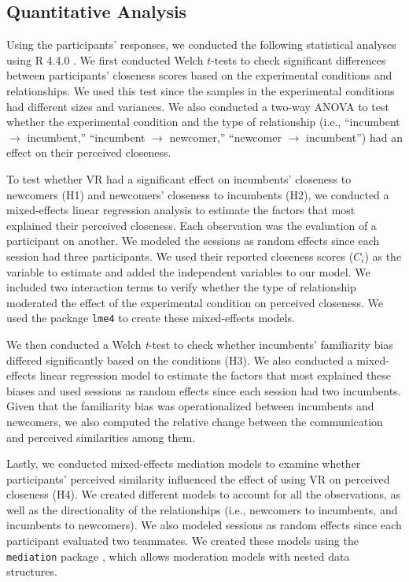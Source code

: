 \subsection{Quantitative Analysis}
Using the participants' responses, we conducted the following statistical analyses using R 4.4.0 \cite{R2024}.  We first conducted Welch $t$-tests to check significant differences between participants' closeness scores based on the experimental conditions and relationships. We used this test since the samples in the experimental conditions had different sizes and variances. We also conducted a two-way ANOVA to test whether the experimental condition and the type of relationship (i.e., ``incumbent $\rightarrow$ incumbent,'' ``incumbent $\rightarrow$ newcomer,'' ``newcomer $\rightarrow$ incumbent'') had an effect on their perceived closeness. 

To test whether VR had a significant effect on incumbents' closeness to newcomers (H1) and newcomers' closeness to incumbents (H2), we conducted a mixed-effects linear regression analysis to estimate the factors that most explained their perceived closeness. Each observation was the evaluation of a participant on another. We modeled the sessions as random effects since each session had three participants. We used their reported closeness scores ($C_{i}$) as the variable to estimate and added the independent variables to our model. We included two interaction terms to verify whether the type of relationship moderated the effect of the experimental condition on perceived closeness. We used the package \texttt{lme4} \cite{Bates2015} to create these mixed-effects models.

We then conducted a Welch \textit{t}-test to check whether incumbents' familiarity bias differed significantly based on the conditions (H3). We also conducted a mixed-effects linear regression model to estimate the factors that most explained these biases and used sessions as random effects since each session had two incumbents. Given that the familiarity bias was operationalized between incumbents and newcomers, we also computed the relative change between the communication and perceived similarities among them.

Lastly, we conducted mixed-effects mediation models to examine whether participants' perceived similarity influenced the effect of using VR on perceived closeness (H4). We created different models to account for all the observations, as well as the directionality of the relationships (i.e., newcomers to incumbents, and incumbents to newcomers). We also modeled sessions as random effects since each participant evaluated two teammates. We created these models using the \texttt{mediation} package \cite{Tingley2014}, which allows moderation models with nested data structures.

